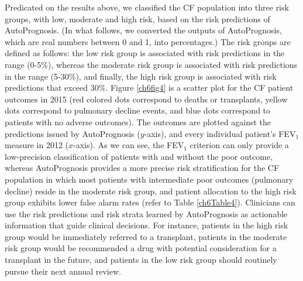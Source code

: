 \documentclass [PhD] {uclathes}
\begin{document}
Predicated on the results above, we classified the CF population into three risk groups, with low, moderate and high risk, based on the risk predictions of AutoPrognosis. (In what follows, we converted the outputs of AutoPrognosis, which are real numbers between 0 and 1, into percentages.) The risk groups are defined as follows: the low risk group is associated with risk predictions in the range (0-5$\%$), whereas the moderate risk group is associated with risk predictions in the range (5-30$\%$), and finally, the high risk group is associated with risk predictions that exceed 30$\%$. Figure \ref{ch6fig4} is a scatter plot for the CF patient outcomes in 2015 (red colored dots correspond to deaths or transplants, yellow dots correspond to pulmonary decline events, and blue dots correspond to patients with no adverse outcomes). The outcomes are plotted against the predictions issued by AutoPrognosis ($y$-axis), and every individual patient's FEV$_1$ measure in 2012 ($x$-axis). As we can see, the FEV$_1$ criterion can only provide a low-precision classification of patients with and without the poor outcome, whereas AutoPrognosis provides a more precise risk stratification for the CF population in which most patients with intermediate poor outcomes (pulmonary decline) reside in the moderate risk group, and patient allocation to the high risk group exhibits lower false alarm rates (refer to Table \ref{ch6Table4}). Clinicians can use the risk predictions and risk strata learned by AutoPrognosis as actionable information that guide clinical decisions. For instance, patients in the high risk group would be immediately referred to a transplant, patients in the moderate risk group would be recommended a drug with potential consideration for a transplant in the future, and patients in the low risk group should routinely pursue their next annual review.    
\end{document}
